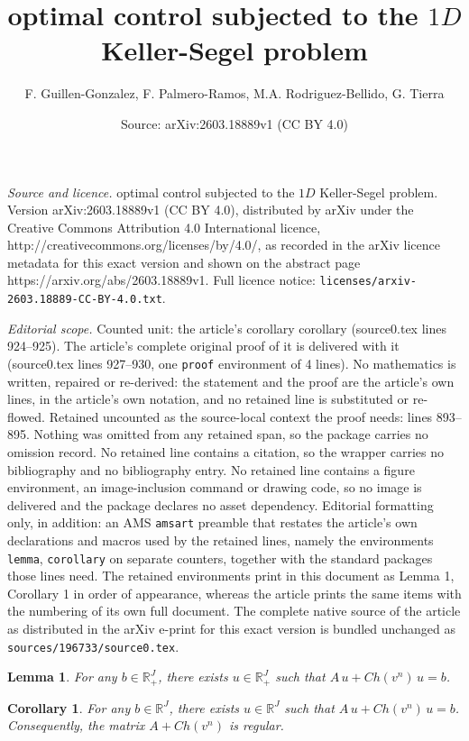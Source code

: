 \documentclass[10pt,a4paper]{amsart}
\title{optimal control subjected to the $1D$ Keller-Segel problem}
\author{F. Guillen-Gonzalez, F. Palmero-Ramos, M.A. Rodriguez-Bellido, G. Tierra}
\date{Source: arXiv:2603.18889v1 (CC BY 4.0)}
\newtheorem{lemma}{Lemma}
\newtheorem{corollary}{Corollary}
\begin{document}
\maketitle

\noindent\emph{Source and licence.} optimal control subjected to the $1D$ Keller-Segel problem. Version arXiv:2603.18889v1 (CC BY 4.0), distributed by arXiv under the Creative Commons Attribution 4.0 International licence, http://creativecommons.org/licenses/by/4.0/, as recorded in the arXiv licence metadata for this exact version and shown on the abstract page https://arxiv.org/abs/2603.18889v1. Full licence notice: \texttt{licenses/arxiv-2603.18889-CC-BY-4.0.txt}.\par\smallskip

\noindent\textit{Editorial scope.} Counted unit: the article's corollary corollary (source0.tex lines 924--925). The article's complete original proof of it is delivered with it (source0.tex lines 927--930, one \texttt{proof} environment of 4 lines). No mathematics is written, repaired or re-derived: the statement and the proof are the article's own lines, in the article's own notation, and no retained line is substituted or re-flowed.  Retained uncounted as the source-local context the proof needs: lines 893--895.  Nothing was omitted from any retained span, so the package carries no omission record.  No retained line contains a citation, so the wrapper carries no bibliography and no bibliography entry.  No retained line contains a figure environment, an image-inclusion command or drawing code, so no image is delivered and the package declares no asset dependency.  Editorial formatting only, in addition: an AMS \texttt{amsart} preamble that restates the article's own declarations and macros used by the retained lines, namely the environments \texttt{lemma}, \texttt{corollary} on separate counters, together with the standard packages those lines need.  The retained environments print in this document as Lemma 1, Corollary 1 in order of appearance, whereas the article prints the same items with the numbering of its own full document.  The complete native source of the article as distributed in the arXiv e-print for this exact version is bundled unchanged as \texttt{sources/196733/source0.tex}.
\begin{lemma}  \label{sol-pos}
 For any $b\in \mathbb{R}^J_+$, there exists $u\in \mathbb{R}^J_+$ such that $A\, u+Ch(v^n)\, u =b$.
 \end{lemma} 

 \begin{corollary}  For any $b\in \mathbb{R}^J$, there exists $u\in \mathbb{R}^J$ such that $A\, u+Ch(v^n)\, u =b$. Consequently, the matrix $A+ Ch(v^n) $ is regular.
  \end{corollary}
\end{document}
